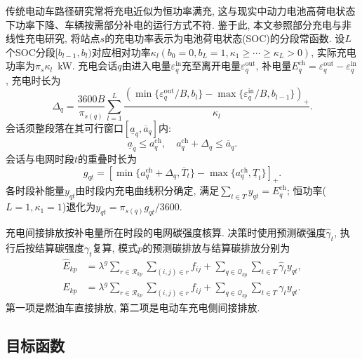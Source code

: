 \documentclass{setp-new}
\begin{document}
传统电动车路径研究常将充电近似为恒功率满充,
这与现实中动力电池高荷电状态下功率下降、车辆按需部分补电的运行方式不符.
鉴于此, 本文参照部分充电与非线性充电研究\cite{ref:45,ref:46},
将站点$s$的充电功率表示为电池荷电状态(SOC)的分段常函数.
设$L$个SOC分段$[b_{l-1},b_l)$对应相对功率$\kappa_l(b_0=0,b_L=1,\kappa_1\ge\cdots\ge\kappa_L>0)$,
实际充电功率为$\pi_s\kappa_l$~kW.
充电会话$q$由进入电量$\varepsilon_q^{\mathrm{in}}$充至离开电量$\varepsilon_q^{\mathrm{out}}$,
补电量$E_q^{\mathrm{ch}}=\varepsilon_q^{\mathrm{out}}-\varepsilon_q^{\mathrm{in}}$,
充电时长为
\begin{equation}
\Delta_q=\frac{3600 B}{\pi_{s(q)}}\sum_{l=1}^{L}
\frac{(\min\{\varepsilon_q^{\mathrm{out}}/B,b_l\}
-\max\{\varepsilon_q^{\mathrm{in}}/B,b_{l-1}\})_+}{\kappa_l}.
\label{eq:charge_duration}
\end{equation}
会话须整段落在其可行窗口$[\underline a_q,\overline a_q]$内:
\begin{equation}
\underline a_q\le a_q^{\mathrm{ch}},\quad a_q^{\mathrm{ch}}+\Delta_q\le\overline a_q.
\label{eq:charge_window}
\end{equation}
会话与电网时段$t$的重叠时长为
\begin{equation}
g_{qt}=[\min\{a_q^{\mathrm{ch}}+\Delta_q,\overline T_t\}-\max\{a_q^{\mathrm{ch}},\underline T_t\}]_+ .
\label{eq:charge_overlap}
\end{equation}
各时段补能量$y_{qt}$由时段内充电曲线积分确定, 满足$\sum_{t\in T}y_{qt}=E_q^{\mathrm{ch}}$;
恒功率($L=1,\kappa_1=1$)退化为$y_{qt}=\pi_{s(q)}g_{qt}/3600$.

充电间接排放按补电量所在时段的电网碳强度核算.
决策时使用预测碳强度$\widehat\gamma_t$, 执行后按结算碳强度$\gamma_t$复算,
模式$p$的预测碳排放与结算碳排放分别为
\begin{equation}
\begin{aligned}
\widehat E_{kp}&=\lambda^g\sum_{r\in\mathcal R_{kp}}\sum_{(i,j)\in r}f_{ij}
+\sum_{q\in\mathcal Q_{kp}}\sum_{t\in T}\widehat\gamma_t y_{qt},\\
E_{kp}&=\lambda^g\sum_{r\in\mathcal R_{kp}}\sum_{(i,j)\in r}f_{ij}
+\sum_{q\in\mathcal Q_{kp}}\sum_{t\in T}\gamma_t y_{qt}.
\end{aligned}
\label{eq:carbon}
\end{equation}
第一项是燃油车直接排放, 第二项是电动车充电侧间接排放.

\subsection{目标函数}
\end{document}
